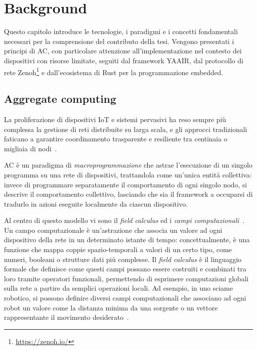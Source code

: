\chapter{Background}
\label{chap:background}

Questo capitolo introduce le tecnologie, i paradigmi e i concetti fondamentali
necessari per la comprensione del contributo della tesi.
Vengono presentati i principi di \ac{AC}, con particolare attenzione all'implementazione
nel contesto dei dispositivi con risorse limitate, seguiti dal framework \ac{YAAIR},
dal protocollo di rete Zenoh\footnote{\url{https://zenoh.io/}} e dall'ecosistema
di Rust per la programmazione embedded.

\section{Aggregate computing}
\label{sec:aggregate-computing}

La proliferazione di dispositivi \ac{IoT} e sistemi pervasivi ha reso sempre più
complessa la gestione di reti distribuite su larga scala, e gli approcci tradizionali
faticano a garantire coordinamento trasparente e resiliente tra centinaia o migliaia
di nodi~\cite{10.1007/978-3-031-95589-1_12}.

\ac{AC} è un paradigma di \emph{macroprogrammazione} che astrae l'esecuzione di
un singolo programma su una rete di dispositivi, trattandola come un'unica entità
collettiva: invece di programmare separatamente il comportamento di ogni singolo
nodo, si descrive il comportamento collettivo, lasciando che sia il framework a
occuparsi di tradurlo in azioni eseguite localmente da ciascun dispositivo.

Al centro di questo modello vi sono il \emph{field calculus} ed i \emph{campi
computazionali}~\cite{10.1007/978-3-031-95589-1_12}.
Un campo computazionale è un'astrazione che associa un valore ad ogni dispositivo
della rete in un determinato istante di tempo: concettualmente, è una funzione
che mappa coppie spazio-temporali a valori di un certo tipo, come numeri, booleani
o strutture dati più complesse.
Il \emph{field calculus} è il linguaggio formale che definisce come questi
campi possano essere costruiti e combinati tra loro tramite operatori
funzionali, permettendo di esprimere computazioni globali sulla rete a
partire da semplici operazioni locali.
Ad esempio, in uno sciame robotico, si possono definire diversi campi computazionali
che associano ad ogni robot un valore come la distanza minima da una sorgente o
un vettore rappresentante il movimento desiderato~\cite{amslaurea37138}.

